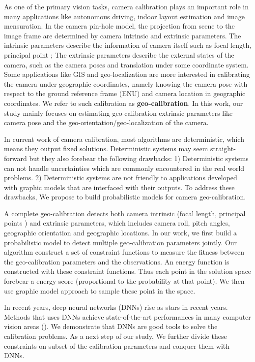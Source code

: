 As one of the primary vision tasks, camera calibration plays an
important role in many applications like autonomous driving, indoor
layout estimation and image mensuration. 
In the camera pin-hole model, the projection from scene to the image
frame are determined by camera intrinsic and extrinsic parameters. 
The intrinsic parameters describe the information of camera
itself such as focal length, principal point \etc; 
The extrinsic parameters describe the external states of the
camera, such as the camera poses and translation under some
coordinate system.
Some applications like GIS and geo-localization are more interested in
calibrating the camera under geographic coordinates, namely knowing
the camera pose with respect to the ground reference frame (\ie ENU)
and camera location in geographic coordinates. We refer to such
calibration as \textbf{geo-calibration}.
In this work, our study mainly focuses on estimating geo-calibration
extrinsic parameters like camera pose and the
geo-orientation/geo-localization of the camera.

In current work of camera calibration, most algorithms are
deterministic, which means they output fixed solutions. Deterministic
systems may seem straight-forward but they also forebear the following
drawbacks: 1) Deterministic systems can not handle uncertainties which
are commonly encountered in the real world problems.  2) Deterministic
systems are not friendly to applications developed with graphic models
that are interfaced with their outputs.
To address these drawbacks, We propose to build probabilistic
models for camera geo-calibration.

A complete geo-calibration detects both camera intrinsic (focal length,
principal points \etc) and extrinsic parameters, which includes camera
roll, pitch angles, geographic orientation and geographic locations.
In our work, we first build a probabilistic model to detect multiple
geo-calibration parameters jointly. Our algorithm construct a set of
constraint functions to measure the fitness between the
geo-calibration parameters and the observations. An energy function
is constructed with these constraint functions. Thus each point in the
solution space forebear a energy score (proportional to the
probability at that point). We then use graphic model approach to
sample these point in the space.
 
In recent years, deep neural networks (DNNs) rise as stars in recent
years. Methods that uses DNNs achieve state-of-the-art performances in
many computer vision areas (). We demonstrate that
DNNs are good tools to solve the calibration problems. 
As a next step of our study, We further
divide these constraints on subset of the calibration parameters and
conquer them with DNNs.

